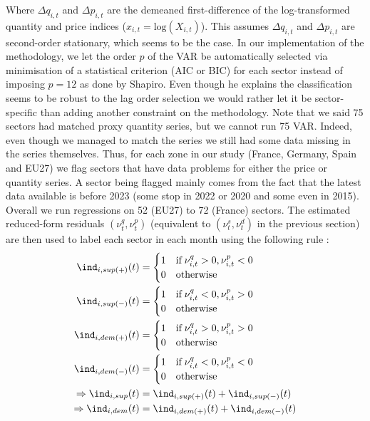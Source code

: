 Where $\Delta q_{i,t}$ and $\Delta p_{i,t}$ are the demeaned first-difference of the log-transformed quantity and price indices ($x_{i,t} = \textrm{log}(X_{i,t})$).
This assumes $\Delta q_{i,t}$ and $\Delta p_{i,t}$ are second-order stationary, which seems to be the case. 
\bigbreak
In our implementation of the methodology, we let the order $p$ of the VAR be automatically selected via minimisation of a statistical criterion (AIC or BIC) for each sector instead of imposing $p=12$ as done by Shapiro.
Even though he explains the classification seems to be robust to the lag order selection we would rather let it be sector-specific than adding another constraint on the methodology.
\bigbreak
Note that we said 75 sectors had matched proxy quantity series, but we cannot run 75 VAR. Indeed, even though we managed to match the series we still had some data missing in the series themselves.
Thus, for each zone in our study (France, Germany, Spain and EU27) we flag sectors that have data problems for either the price or quantity series. A sector being flagged mainly comes from the fact that the latest data available is before 2023 (some stop in 2022 or 2020 and some even in 2015).
Overall we run regressions on 52 (EU27) to 72 (France) sectors.
\bigbreak
The estimated reduced-form residuals $(\nu_{t}^{q},\nu_{t}^{p})$ (equivalent to $(\nu_{t}^{s},\nu_{t}^{d})$ in the previous section) are then used to label each sector in each month using the following rule :
\begin{align*}
    \ind_{i,sup(+)}(t) &= \begin{cases} 1 \quad \textrm{if} \; \nu_{i,t}^{q}>0,\nu_{i,t}^{p}<0 \\ 0 \quad \textrm{otherwise} \end{cases} \\
    \ind_{i,sup(-)}(t) &= \begin{cases} 1 \quad \textrm{if} \; \nu_{i,t}^{q}<0,\nu_{i,t}^{p}>0 \\ 0 \quad \textrm{otherwise} \end{cases} \\
    \ind_{i,dem(+)}(t) &= \begin{cases} 1 \quad \textrm{if} \; \nu_{i,t}^{q}>0,\nu_{i,t}^{p}>0 \\ 0 \quad \textrm{otherwise} \end{cases} \\
    \ind_{i,dem(-)}(t) &= \begin{cases} 1 \quad \textrm{if} \; \nu_{i,t}^{q}<0,\nu_{i,t}^{p}<0 \\ 0 \quad \textrm{otherwise} \end{cases} \\
    \Rightarrow \ind_{i,sup}(t) &= \ind_{i,sup(+)}(t) + \ind_{i,sup(-)}(t) \\
    \Rightarrow \ind_{i,dem}(t) &= \ind_{i,dem(+)}(t) + \ind_{i,dem(-)}(t) \\
\end{align*}

